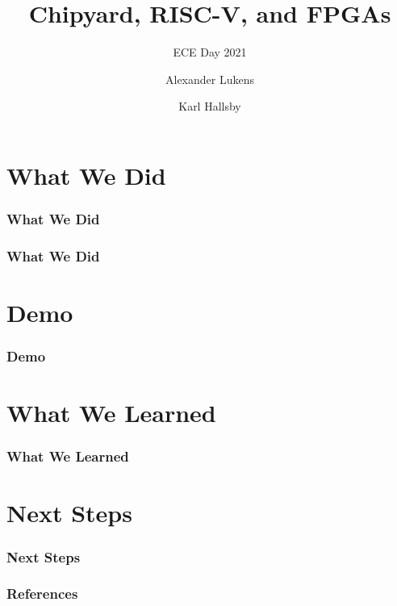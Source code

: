 \documentclass{slides}
\title[Chipyard]{Chipyard, RISC-V, and FPGAs}
\subtitle{ECE Day 2021}
\author{Alexander Lukens \and Karl Hallsby}
\institute{Illinois Institute of Technology}
\date{\DTMdisplaydate{2021}{4}{9}{-1}}
\begin{document}
\nocite{chipyard}

\begin{frame}
  \titlepage{}
\end{frame}

\section{What We Did}
\begin{frame}
  \frametitle{What We Did}
  \end{frame}

\begin{frame}
  \frametitle{What We Did}
\end{frame}

\section{Demo}\label{sec:Demo}
\begin{frame}
	\frametitle{Demo}
\end{frame}

\section{What We Learned}\label{sec:What_We_Learned}
\begin{frame}
  \frametitle{What We Learned}
\end{frame}

\section{Next Steps}\label{sec:Next_Steps}
\begin{frame}
  \frametitle{Next Steps}
\end{frame}

\begin{frame}
  \frametitle{References}

  \printbibliography[heading=bibintoc]{}
\end{frame}
\end{document}
